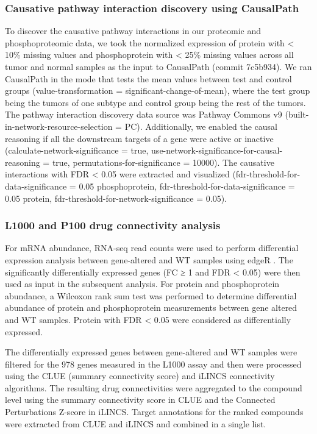 \subsubsection{Causative pathway interaction discovery using CausalPath}
To discover the causative pathway interactions in our proteomic and phosphoproteomic data, we took the normalized expression of protein with < 10\% missing values and phosphoprotein with < 25\% missing values across all tumor and normal samples as the input to CausalPath (commit 7c5b934). We ran CausalPath in the mode that tests the mean values between test and control groups (value-transformation = significant-change-of-mean), where the test group being the tumors of one subtype and control group being the rest of the tumors. The pathway interaction discovery data source was Pathway Commons v9 (built-in-network-resource-selection = PC). Additionally, we enabled the causal reasoning if all the downstream targets of a gene were active or inactive (calculate-network-significance = true, use-network-significance-for-causal-reasoning = true, permutations-for-significance = 10000). The causative interactions with FDR < 0.05 were extracted and visualized (fdr-threshold-for-data-significance = 0.05 phosphoprotein, fdr-threshold-for-data-significance = 0.05 protein, fdr-threshold-for-network-significance = 0.05).

\subsubsection{L1000 and P100 drug connectivity analysis}
For mRNA abundance, RNA-seq read counts were used to perform differential expression analysis between gene-altered and WT samples using edgeR \cite{robinsonmd_smythgk:EdgeRBioconductor2010}. The significantly differentially expressed genes (FC ≥ 1 and FDR < 0.05) were then used as input in the subsequent analysis. For protein and phosphoprotein abundance, a Wilcoxon rank sum test was performed to determine differential abundance of protein and phosphoprotein measurements between gene altered and WT samples. Protein with FDR < 0.05 were considered as differentially expressed.

The differentially expressed genes between gene-altered and WT samples were filtered for the 978 genes measured in the L1000 assay and then were processed using the CLUE \cite{subramaniana_golubtr:NextGeneration2017} (summary connectivity score) and iLINCS \cite{pilarczykm_medvedovicm:ConnectingOmics2020} connectivity algorithms. The resulting drug connectivities were aggregated to the compound level using the summary connectivity score in CLUE and the Connected Perturbations Z-score in iLINCS. Target annotations for the ranked compounds were extracted from CLUE and iLINCS and combined in a single list.


